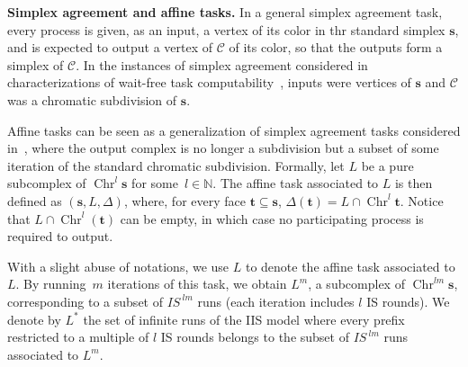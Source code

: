 \documentclass[a4paper]{article}
\newcommand{\myparagraph}[1]{\vspace{6pt}\noindent \textbf{#1}}
\def\C{\ensuremath{\mathcal{C}}}
\newcommand{\remove}[1]{}
\def\s {\mathbf{s}}
\def\t {\mathbf{t}}
\def\Chr{\operatorname{Chr}}
\def\IS{\textit{IS}}
\begin{document}
\remove{
Each 
run of~IS$^m$ corresponds to a simplex in~$\Chr^m \s$. Every 
vertex~$v$ of~$\Chr^m \s$ is thus defined 
as~$(p,\IS^1(p,\sigma),\ldots,\IS^m(p,\sigma))$, where 
each~$\IS^i(p,\sigma)$ is interpreted as the set of processes 
appearing in the~$i^{th}$ IS iteration obtained by~$p$ in the 
corresponding~$\IS^m$ run. The \emph{carrier} of vertex~$v$ is 
then defined as the set of all processes seen by~$p$ in this run, 
possibly through the views of other processes: it is the 
smallest face of~$\s$ that contains~$v$ in its geometric 
realization. The carrier of a simplex is the maximal carrier 
of its vertices (related by inclusion). 
}


\myparagraph{Simplex agreement and affine tasks.}
In a general simplex agreement task, every process is given, as an
input, a vertex of its color in thr standard simplex $\s$, and is
expected to output a vertex of $\C$ of its color, so that the outputs
form a simplex of $\C$.   
In the instances of simplex agreement considered in characterizations
of wait-free task computability~\cite{BG97,HS99}, inputs were vertices
of $\s$ and $\C$ was a chromatic subdivision of $\s$.

Affine tasks can be seen as a generalization of simplex agreement
tasks considered in~\cite{BG97,HS99}, where the output 
complex is no longer a subdivision but a subset of some 
iteration of the standard chromatic subdivision.
Formally, let $L$ be a pure subcomplex of $\Chr^l\s$ for some~$l\in \mathbb{N}$.
The affine task associated to $L$ is then defined as $(\s,L,\Delta)$, 
where, for every face 
$\t \subseteq \s$, $\Delta(\t) = L \cap \Chr^l \t$.
Notice that $L \cap \Chr^l(\t)$ can be empty, in which case no
participating process is required to output.

With a slight abuse of 
notations, we use $L$ to denote the affine task 
associated to $L$. 
By running~$m$ iterations of this task, we obtain $L^m$, a 
subcomplex of $\Chr^{lm}\s$, corresponding to a subset of 
$\IS^{~lm}$ runs (each iteration includes $l$ IS rounds). We 
denote by $L^*$ the set of infinite runs of the IIS model where 
every prefix restricted to a multiple of $l$ IS rounds 
belongs to the subset of $\IS^{~lm}$ runs associated to $L^m$.
\end{document}
